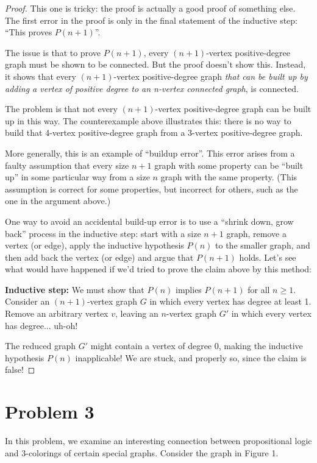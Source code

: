 \documentclass[14pt]{extarticle}
\begin{document}
\begin{proof}
This one is tricky: the proof is actually a good proof of something else. The first error in the proof is only in the final statement of the inductive step: “This proves $P (n + 1)$”.

The issue is that to prove $P (n + 1)$, every $(n + 1)$-vertex positive-degree graph must be shown to be connected. But the proof doesn’t show this. Instead, it shows that every $(n + 1)$-vertex positive-degree graph {\it that can be built up by adding a vertex of positive degree to an n-vertex connected graph}, is
connected.

The problem is that not every $(n + 1)$-vertex positive-degree graph can be built up in this way. The counterexample above illustrates this: there is no way to build that 4-vertex positive-degree graph from a 3-vertex positive-degree graph.

More generally, this is an example of “buildup error”. This error arises from a faulty assumption that every size $n + 1$ graph with some property can be “built up” in some particular way from a
size $n$ graph with the same property. (This assumption is correct for some properties, but incorrect for others, such as the one in the argument above.)

One way to avoid an accidental build-up error is to use a “shrink down, grow back” process in the inductive step: start with a size $n + 1$ graph, remove a vertex (or edge), apply the inductive
hypothesis $P (n)$ to the smaller graph, and then add back the vertex (or edge) and argue that $P (n + 1)$ holds. Let’s see what would have happened if we’d tried to prove the claim above by
this method:

{\bf Inductive step:} We must show that $P (n)$ implies $P (n + 1)$ for all $n \geq 1$. Consider an $(n + 1)$-vertex graph $G$ in which every vertex has degree at least 1. Remove an arbitrary vertex $v$, leaving an $n$-vertex graph $G'$ in which every vertex has degree... uh-oh! 

The reduced graph $G'$ might contain a vertex of degree 0, making the inductive hypothesis $P (n)$ inapplicable! We are stuck, and properly so, since the claim is false!
\end{proof}

\section{Problem 3}
In this problem, we examine an interesting connection between propositional logic and 3-colorings of certain
special graphs. Consider the graph in Figure 1. 
\end{document}
